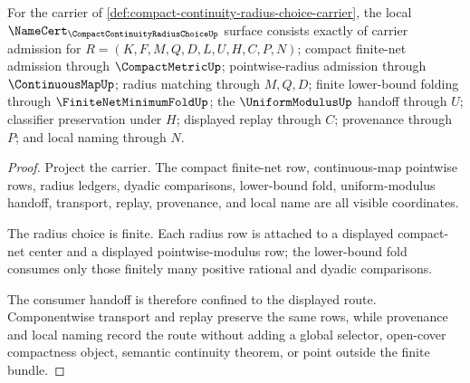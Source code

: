 \begin{theorem}
\label{thm:compact-continuity-radius-choice-namecert-obligations}
For the carrier of \autoref{def:compact-continuity-radius-choice-carrier}, the local $\NameCert_{\CompactContinuityRadiusChoiceUp}$ surface consists exactly of carrier admission for $R=(K,F,M,Q,D,L,U,H,C,P,N)$; compact finite-net admission through $\CompactMetricUp$; pointwise-radius admission through $\ContinuousMapUp$; radius matching through $M,Q,D$; finite lower-bound folding through $\FiniteNetMinimumFoldUp$; the $\UniformModulusUp$ handoff through $U$; classifier preservation under $H$; displayed replay through $C$; provenance through $P$; and local naming through $N$.
\end{theorem}
\begin{proof}
Project the carrier. The compact finite-net row, continuous-map pointwise rows, radius ledgers, dyadic comparisons, lower-bound fold, uniform-modulus handoff, transport, replay, provenance, and local name are all visible coordinates.

The radius choice is finite. Each radius row is attached to a displayed compact-net center and a displayed pointwise-modulus row; the lower-bound fold consumes only those finitely many positive rational and dyadic comparisons.

The consumer handoff is therefore confined to the displayed route. Componentwise transport and replay preserve the same rows, while provenance and local naming record the route without adding a global selector, open-cover compactness object, semantic continuity theorem, or point outside the finite bundle.
\end{proof}

